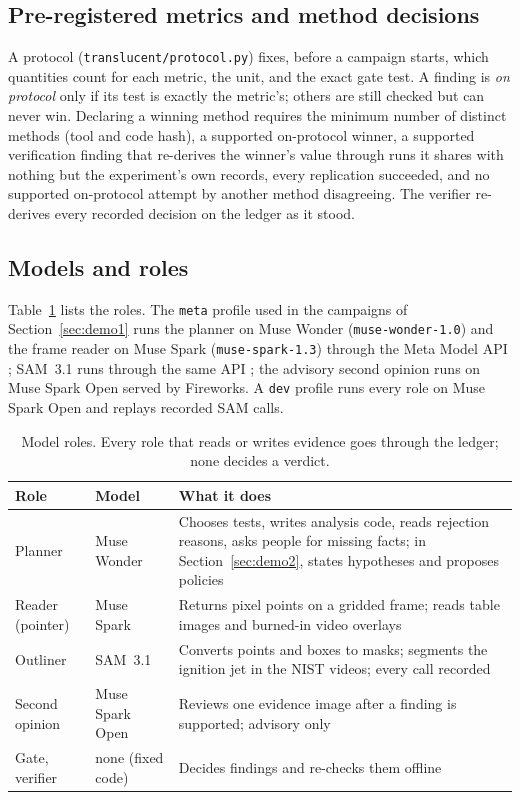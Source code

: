 \documentclass[11pt]{article}
\newcommand{\cmd}[1]{\texttt{#1}}
\begin{document}
\subsection{Pre-registered metrics and method decisions}
A protocol (\cmd{translucent/protocol.py}) fixes, before a campaign starts, which quantities count for each metric,
the unit, and the exact gate test. A finding is \emph{on protocol} only if its test is exactly the metric's; others
are still checked but can never win. Declaring a winning method requires the minimum number of distinct methods
(tool and code hash), a supported on-protocol winner, a supported verification finding that re-derives the winner's
value through runs it shares with nothing but the experiment's own records, every replication succeeded, and no
supported on-protocol attempt by another method disagreeing. The verifier re-derives every recorded decision on the
ledger as it stood.

\subsection{Models and roles}
Table~\ref{tab:models} lists the roles. The \texttt{meta} profile used in the campaigns of
Section~\ref{sec:demo1} runs the planner on Muse Wonder (\texttt{muse-wonder-1.0}) and the frame reader on Muse Spark
(\texttt{muse-spark-1.3}) through the Meta Model API \citep{meta2026modelsdocs}; SAM~3.1 runs through the same API
\citep{meta2026segmentation}; the advisory second opinion runs on Muse Spark Open served by Fireworks. A
\texttt{dev} profile runs every role on Muse Spark Open and replays recorded SAM calls.

\begin{table}[t]
\centering\small
\caption{Model roles. Every role that reads or writes evidence goes through the ledger; none decides a verdict.}
\label{tab:models}
\begin{tabular}{@{}p{3.0cm}p{3.6cm}p{8.4cm}@{}}
\toprule
Role & Model & What it does \\
\midrule
Planner & Muse Wonder & Chooses tests, writes analysis code, reads rejection reasons, asks people for missing facts; in Section~\ref{sec:demo2}, states hypotheses and proposes policies \\
Reader (pointer) & Muse Spark & Returns pixel points on a gridded frame; reads table images and burned-in video overlays \\
Outliner & SAM~3.1 & Converts points and boxes to masks; segments the ignition jet in the NIST videos; every call recorded \\
Second opinion & Muse Spark Open & Reviews one evidence image after a finding is supported; advisory only \\
Gate, verifier & none (fixed code) & Decides findings and re-checks them offline \\
\bottomrule
\end{tabular}
\end{table}
\end{document}
